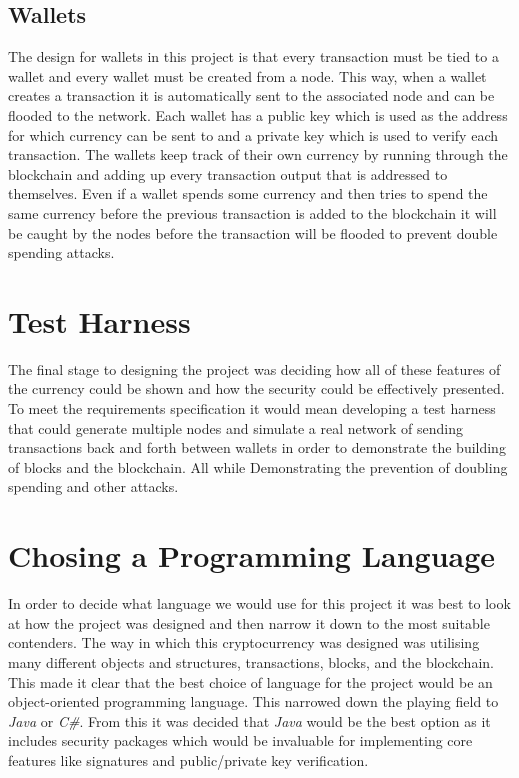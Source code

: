 \documentclass{l4proj}
\begin{document}
\subsection{Wallets}
The design for wallets in this project is that every transaction must be tied to a wallet and every wallet
must be created from a node. This way, when a wallet creates a transaction it is automatically sent to the
associated node and can be flooded to the network. Each wallet has a public key which is used as the address
for which currency can be sent to and a private key which is used to verify each transaction. The wallets 
keep track of their own currency by running through the blockchain and adding up every transaction output
that is addressed to themselves. Even if a wallet spends some currency and then tries to spend the same
currency before the previous transaction is added to the blockchain it will be caught by the nodes before the
transaction will be flooded to prevent double spending attacks.

\section{Test Harness}
The final stage to designing the project was deciding how all of these features of the currency could be shown
and how the security could be effectively presented. To meet the requirements specification it would mean developing
a test harness that could generate multiple nodes and simulate a real network of sending transactions back and 
forth between wallets in order to demonstrate the building of blocks and the blockchain. All while Demonstrating
the prevention of doubling spending and other attacks. 

\section{Chosing a Programming Language}
In order to decide what language we would use for this project it was best to look at how the project was designed
and then narrow it down to the most suitable contenders. The way in which this cryptocurrency was designed was 
utilising many different objects and structures, transactions, blocks, and the blockchain. This made it clear that 
the best choice of language for the project would be an object-oriented programming language. This narrowed down
the playing field to \textit{Java} or \textit{C\#}. From this it was decided that \textit{Java} would be the best 
option as it includes security packages which would be invaluable for implementing core features like signatures and 
public/private key verification.
\end{document}
